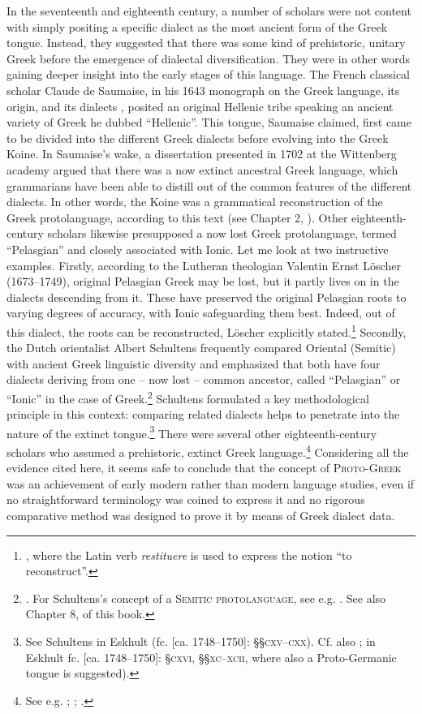 In the seventeenth and eighteenth century, a number of scholars were not content with simply positing a specific dialect as the most ancient form of the Greek tongue. Instead, they suggested that there was some kind of prehistoric, unitary Greek before the emergence of dialectal diversification. They were in other words gaining deeper insight into the early stages of this language. The French classical scholar Claude de Saumaise, in his 1643 monograph on the Greek language, its origin, and its dialects \citep{Saumaise1643a}, posited an original Hellenic tribe speaking an ancient variety of Greek he dubbed “Hellenic”. This tongue, Saumaise claimed, first came to be divided into the different Greek dialects before evolving into the Greek Koine. In Saumaise’s wake, a dissertation presented in 1702 at the Wittenberg academy argued that there was a now extinct ancestral Greek language, which grammarians have been able to distill out of the common features of the different dialects. In other words, the Koine was a grammatical reconstruction of the Greek protolanguage, according to this text (see Chapter 2, ). Other eighteenth-century scholars likewise presupposed a now lost Greek protolanguage, termed “Pelasgian” and closely associated with Ionic. Let me look at two instructive examples. Firstly, according to the Lutheran theologian Valentin Ernst Löscher (1673–1749), original Pelasgian Greek may be lost, but it partly lives on in the dialects descending from it. These have preserved the original Pelasgian roots to varying degrees of accuracy, with Ionic safeguarding them best. Indeed, out of this dialect, the roots can be reconstructed, Löscher explicitly stated.\footnote{\citet[24–25, 84–85]{Loscher1705}, where the Latin verb \textit{restituere} is used to express the notion “to reconstruct”.} Secondly, the Dutch orientalist Albert Schultens frequently compared Oriental (Semitic) with ancient Greek linguistic diversity and emphasized that both have four dialects deriving from one – now lost – common ancestor, called “Pelasgian” or “Ionic” in the case of Greek.\footnote{\citet[\textsc{lxxv–lxxvi,} \textsc{xcii–xciv,} \textsc{civ}]{Schultens1748}. For Schultens’s concept of a \textsc{Semitic} \textsc{protolanguage}, see e.g. \citet[esp. 84--86]{Eskhult2015}. See also Chapter 8,  of this book.} Schultens formulated a key methodological principle in this context: comparing related dialects helps to penetrate into the nature of the extinct tongue.\footnote{See Schultens in Eskhult (fc. [ca. 1748–1750]: §§\textsc{cxv–cxx}). Cf. also \citet[19--20]{Schultens1738a}; in Eskhult fc. [ca. 1748–1750]: §\textsc{cxvi}, §§\textsc{xc–xcii,} where also a Proto-Germanic tongue is suggested).} There were several other eighteenth-century scholars who assumed a prehistoric, extinct Greek language.\footnote{See e.g. \citet[1--2]{Munthe1748}; \citet[104--106]{Hemsterhuis2015}; \citet[15]{Wise1758}.} Considering all the evidence cited here, it seems safe to conclude that the concept of \textsc{Proto-Greek} was an achievement of early modern rather than modern language studies, even if no straightforward terminology was coined to express it and no rigorous comparative method was designed to prove it by means of Greek dialect data.

